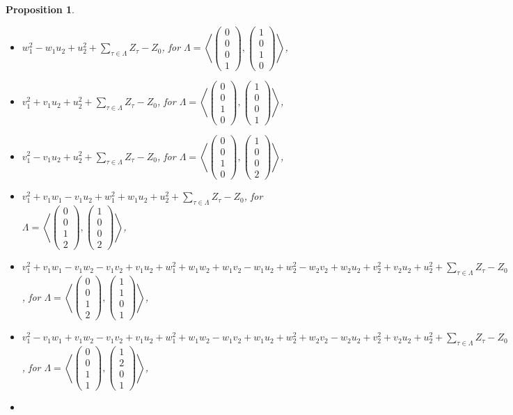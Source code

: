 \documentclass{alggeom}
\newcommand{\vect}[1]{\left( \begin{smallmatrix} #1 \end{smallmatrix} \right)}
\newcommand{\plan}[2]{\left< \vect{ #1 }, \vect{ #2 } \right>}
\theoremstyle{plain}
\newtheorem{prop}[theorem]{Proposition}
\theoremstyle{definition}
\theoremstyle{remark}
\begin{document}
\begin{prop}
\begin{itemize}
\item[(vii)]
$w_1^2-w_1u_2+u_2^2+\sum_{\tau\in \Lambda} Z_\tau-Z_0$, for $\Lambda= \plan{0\\0\\0\\1}{1\\0\\1\\0}$,
\item[(viii)]
$v_1^2+v_1u_2+u_2^2+\sum_{\tau\in \Lambda} Z_\tau-Z_0$, for $\Lambda= \plan{0\\0\\1\\0}{1\\0\\0\\1}$,
\item[(ix)]
$v_1^2-v_1u_2+u_2^2+\sum_{\tau\in \Lambda} Z_\tau-Z_0$, for $\Lambda= \plan{0\\0\\1\\0}{1\\0\\0\\2}$,
\item[(x)]
$v_1^2+v_1w_1-v_1u_2+w_1^2+w_1u_2+u_2^2+\sum_{\tau\in \Lambda} Z_\tau-Z_0$, for $\Lambda = \plan{0\\0\\1\\2}{1\\0\\0\\2}$,
\item[(xi)]
$v_1^2+v_1w_1-v_1w_2-v_1v_2+v_1u_2+w_1^2+w_1w_2+w_1v_2-w_1u_2+w_2^2-w_2v_2+w_2u_2+v_2^2+v_2u_2+u_2^2+\sum_{\tau\in \Lambda} Z_\tau-Z_0$, for $\Lambda = \plan{0\\0\\1\\2}{1\\1\\0\\1}$,
\item[(xii)]
$v_1^2-v_1w_1+v_1w_2-v_1v_2+v_1u_2+w_1^2+w_1w_2-w_1v_2+w_1u_2+w_2^2+w_2v_2-w_2u_2+v_2^2+v_2u_2+u_2^2+\sum_{\tau\in \Lambda} Z_\tau-Z_0$, for $\Lambda = \plan{0\\0\\1\\1}{1\\2\\0\\1}$,
\item[(xiii)]

\end{itemize}
\end{prop}
\end{document}
